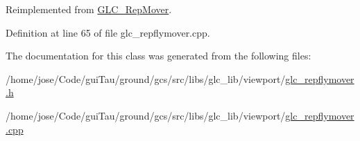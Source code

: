 Reimplemented from \hyperlink{class_g_l_c___rep_mover_ac18cdf6f89e546e2982e363c6641c973}{G\-L\-C\-\_\-\-Rep\-Mover}.



Definition at line 65 of file glc\-\_\-repflymover.\-cpp.



The documentation for this class was generated from the following files\-:\begin{DoxyCompactItemize}
\item 
/home/jose/\-Code/gui\-Tau/ground/gcs/src/libs/glc\-\_\-lib/viewport/\hyperlink{glc__repflymover_8h}{glc\-\_\-repflymover.\-h}\item 
/home/jose/\-Code/gui\-Tau/ground/gcs/src/libs/glc\-\_\-lib/viewport/\hyperlink{glc__repflymover_8cpp}{glc\-\_\-repflymover.\-cpp}\end{DoxyCompactItemize}
